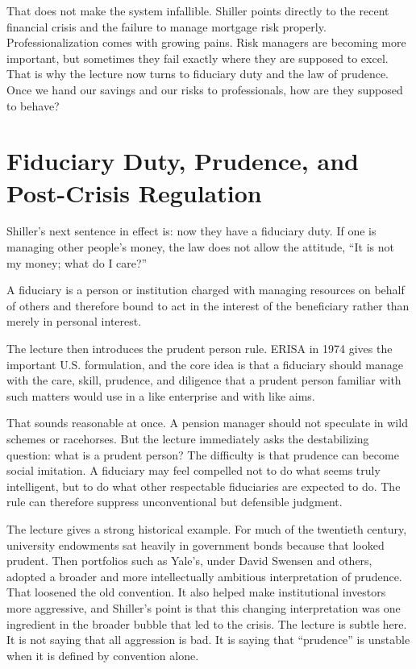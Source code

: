 That does not make the system infallible. Shiller points directly to the recent financial crisis and the failure to manage mortgage risk properly. Professionalization comes with growing pains. Risk managers are becoming more important, but sometimes they fail exactly where they are supposed to excel. That is why the lecture now turns to fiduciary duty and the law of prudence. Once we hand our savings and our risks to professionals, how are they supposed to behave?

\section{Fiduciary Duty, Prudence, and Post-Crisis Regulation}

Shiller's next sentence in effect is: now they have a fiduciary duty. If one is managing other people's money, the law does not allow the attitude, ``It is not my money; what do I care?''

\begin{definition}
A fiduciary is a person or institution charged with managing resources on behalf of others and therefore bound to act in the interest of the beneficiary rather than merely in personal interest.
\end{definition}

The lecture then introduces the prudent person rule. ERISA in 1974 gives the important U.S. formulation, and the core idea is that a fiduciary should manage with the care, skill, prudence, and diligence that a prudent person familiar with such matters would use in a like enterprise and with like aims.

That sounds reasonable at once. A pension manager should not speculate in wild schemes or racehorses. But the lecture immediately asks the destabilizing question: what is a prudent person? The difficulty is that prudence can become social imitation. A fiduciary may feel compelled not to do what seems truly intelligent, but to do what other respectable fiduciaries are expected to do. The rule can therefore suppress unconventional but defensible judgment.

The lecture gives a strong historical example. For much of the twentieth century, university endowments sat heavily in government bonds because that looked prudent. Then portfolios such as Yale's, under David Swensen and others, adopted a broader and more intellectually ambitious interpretation of prudence. That loosened the old convention. It also helped make institutional investors more aggressive, and Shiller's point is that this changing interpretation was one ingredient in the broader bubble that led to the crisis. The lecture is subtle here. It is not saying that all aggression is bad. It is saying that ``prudence'' is unstable when it is defined by convention alone.

